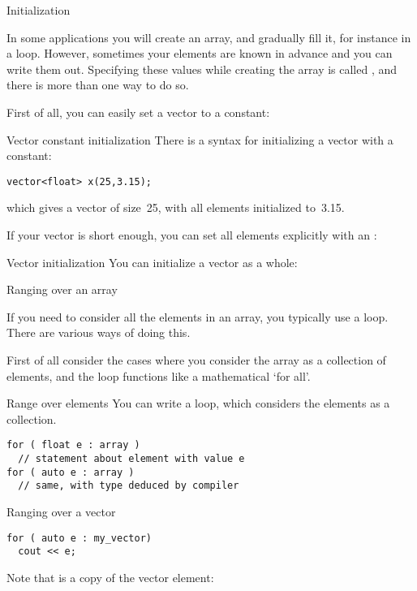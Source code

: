  {Initialization}

In some applications you will create an array, and gradually fill it,
for instance in a loop. However, sometimes your elements are known in
advance and you can write them out. Specifying these values while
creating the array is called , and
there is more than one way to do so.

First of all, you can easily set a vector to a constant:

\begin{block}{Vector constant initialization}
  \label{sl:vector-initconst}
  There is a syntax for initializing a vector with a constant:
\begin{lstlisting}
vector<float> x(25,3.15);
\end{lstlisting}
which gives a vector of size~25, with all elements initialized to~3.15.
\end{block}

If your vector is short enough, you can set all elements explicitly with an
:

\begin{block}{Vector initialization}
  \label{sl:vector-init}
  You can initialize a vector as a whole:
\end{block}

 {Ranging over an array}
\label{sec:arrayrange}

If you need to consider all the elements in an array, you typically
use a  loop. There are various ways of doing this.

First of all consider the cases where you consider the array as a
collection of elements, and the loop functions like a mathematical
`for all'.

\begin{block}{Range over elements}
  \label{sl:array-range}
  You can write a  loop, which
  considers the elements as a collection.
\begin{lstlisting}
for ( float e : array )
  // statement about element with value e
for ( auto e : array )
  // same, with type deduced by compiler
\end{lstlisting}

\end{block}

\begin{block}{Ranging over a vector}
  \label{sl:vector-range}
\begin{lstlisting}
for ( auto e : my_vector)
  cout << e;
\end{lstlisting}
Note that  is a copy of the vector element:
\end{block}

